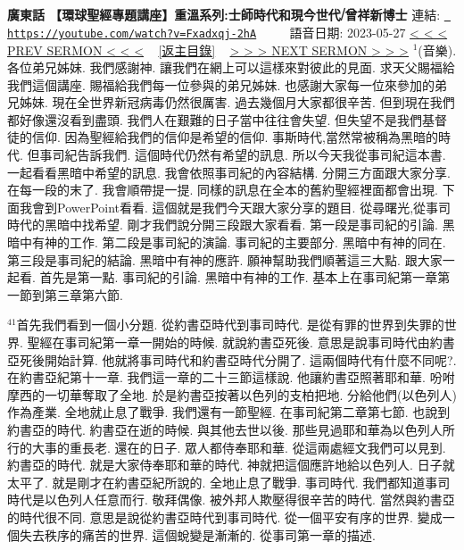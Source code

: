 \documentclass{book}
\begin{document}
\section{}
\label{sec:Fxadxqj_2hA}
\textbf{廣東話 【環球聖經專題講座】重溫系列:士師時代和現今世代⧸曾祥新博士}
\newline
\newline
連結: \href{https://youtube.com/watch?v=Fxadxqj-2hA}{\texttt{ https://youtube.com/watch?v=Fxadxqj-2hA}} ~~~~ 語音日期: 2023-05-27 
\newline
\newline
\hyperref[sec:VHMEb5E_3Qc]{\small{< < < PREV SERMON < < <}}
~
\hyperref[sec:index]{\small{[返主目錄]}}
~
\hyperref[sec:0YlBYq577gM]{\small{> > > NEXT SERMON > > >}}
\newline
\newline
$^{1}$(音樂).
各位弟兄姊妹.
我們感謝神.
讓我們在網上可以這樣來對彼此的見面.
求天父賜福給我們這個講座.
賜福給我們每一位參與的弟兄姊妹.
也感謝大家每一位來參加的弟兄姊妹.
現在全世界新冠病毒仍然很厲害.
過去幾個月大家都很辛苦.
但到現在我們都好像還沒看到盡頭.
我們人在艱難的日子當中往往會失望.
但失望不是我們基督徒的信仰.
因為聖經給我們的信仰是希望的信仰.
事斯時代,當然常被稱為黑暗的時代.
但事司紀告訴我們.
這個時代仍然有希望的訊息.
所以今天我從事司紀這本書.
一起看看黑暗中希望的訊息.
我會依照事司紀的內容結構.
分開三方面跟大家分享.
在每一段的末了.
我會順帶提一提.
同樣的訊息在全本的舊約聖經裡面都會出現.
下面我會到PowerPoint看看.
這個就是我們今天跟大家分享的題目.
從尋曙光,從事司時代的黑暗中找希望.
剛才我們說分開三段跟大家看看.
第一段是事司紀的引論.
黑暗中有神的工作.
第二段是事司紀的演論.
事司紀的主要部分.
黑暗中有神的同在.
第三段是事司紀的結論.
黑暗中有神的應許.
願神幫助我們順著這三大點.
跟大家一起看.
首先是第一點.
事司紀的引論.
黑暗中有神的工作.
基本上在事司紀第一章第一節到第三章第六節.

$^{41}$首先我們看到一個小分題.
從約書亞時代到事司時代.
是從有罪的世界到失罪的世界.
聖經在事司紀第一章一開始的時候.
就說約書亞死後.
意思是說事司時代由約書亞死後開始計算.
他就將事司時代和約書亞時代分開了.
這兩個時代有什麼不同呢?.
在約書亞紀第十一章.
我們這一章的二十三節這樣說.
他讓約書亞照著耶和華.
吩咐摩西的一切華奪取了全地.
於是約書亞按著以色列的支柏把地.
分給他們(以色列人)作為產業.
全地就止息了戰爭.
我們還有一節聖經.
在事司紀第二章第七節.
也說到約書亞的時代.
約書亞在逝的時候.
與其他去世以後.
那些見過耶和華為以色列人所行的大事的重長老.
還在的日子.
眾人都侍奉耶和華.
從這兩處經文我們可以見到.
約書亞的時代.
就是大家侍奉耶和華的時代.
神就把這個應許地給以色列人.
日子就太平了.
就是剛才在約書亞紀所說的.
全地止息了戰爭.
事司時代.
我們都知道事司時代是以色列人任意而行.
敬拜偶像.
被外邦人欺壓得很辛苦的時代.
當然與約書亞的時代很不同.
意思是說從約書亞時代到事司時代.
從一個平安有序的世界.
變成一個失去秩序的痛苦的世界.
這個蛻變是漸漸的.
從事司第一章的描述.
\end{document}
